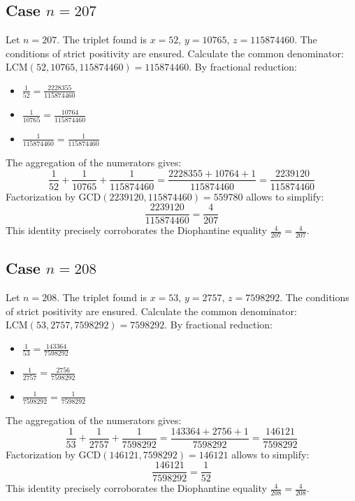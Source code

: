 \documentclass[11pt,a4paper]{article}
\begin{document}
\subsection{Case $n = 207$}
Let $n = 207$. The triplet found is $x = 52$, $y = 10765$, $z = 115874460$.
The conditions of strict positivity are ensured.
Calculate the common denominator: $\text{LCM}(52, 10765, 115874460) = 115874460$.
By fractional reduction:
\begin{itemize}
    \item $\frac{1}{52} = \frac{2228355}{115874460}$
    \item $\frac{1}{10765} = \frac{10764}{115874460}$
    \item $\frac{1}{115874460} = \frac{1}{115874460}$
\end{itemize}
The aggregation of the numerators gives:
$$ \frac{1}{52} + \frac{1}{10765} + \frac{1}{115874460} = \frac{2228355 + 10764 + 1}{115874460} = \frac{2239120}{115874460} $$
Factorization by $\text{GCD}(2239120, 115874460) = 559780$ allows to simplify:
$$ \frac{2239120}{115874460} = \frac{4}{207} $$
This identity precisely corroborates the Diophantine equality $\frac{4}{207} = \frac{4}{207}$.

\subsection{Case $n = 208$}
Let $n = 208$. The triplet found is $x = 53$, $y = 2757$, $z = 7598292$.
The conditions of strict positivity are ensured.
Calculate the common denominator: $\text{LCM}(53, 2757, 7598292) = 7598292$.
By fractional reduction:
\begin{itemize}
    \item $\frac{1}{53} = \frac{143364}{7598292}$
    \item $\frac{1}{2757} = \frac{2756}{7598292}$
    \item $\frac{1}{7598292} = \frac{1}{7598292}$
\end{itemize}
The aggregation of the numerators gives:
$$ \frac{1}{53} + \frac{1}{2757} + \frac{1}{7598292} = \frac{143364 + 2756 + 1}{7598292} = \frac{146121}{7598292} $$
Factorization by $\text{GCD}(146121, 7598292) = 146121$ allows to simplify:
$$ \frac{146121}{7598292} = \frac{1}{52} $$
This identity precisely corroborates the Diophantine equality $\frac{4}{208} = \frac{4}{208}$.
\end{document}
